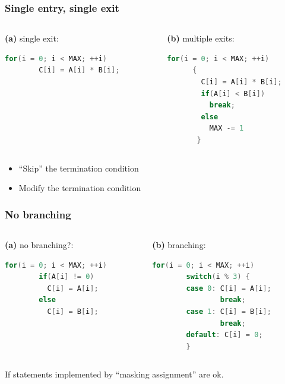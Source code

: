 \documentclass{beamer}
\begin{document}
\begin{frame}[fragile]
  \frametitle{Single entry, single exit}
    \begin{columns}[onlytextwidth]
      \begin{column}{0.5\textwidth}
	 \textbf{(a)} single exit:
	 \begin{lstlisting}[language=C++]
	  for(i = 0; i < MAX; ++i) 
	    C[i] = A[i] * B[i];   
	\end{lstlisting}
      \end{column}
      \begin{column}{0.5\textwidth}
	\textbf{(b)} multiple exits:
	\begin{lstlisting}[language=C++]
	  for(i = 0; i < MAX; ++i) 
	  {
	    C[i] = A[i] * B[i];
	    if(A[i] < B[i])
	      break;
	    else
	      MAX -= 1
	   }
	\end{lstlisting}
      \end{column}
    \end{columns}
    
    \begin{itemize}
     \item ``Skip'' the termination condition
     \item Modify the termination condition
    \end{itemize}

    
\end{frame}

\begin{frame}[fragile]
  \frametitle{No branching}
    \begin{columns}[onlytextwidth]
      \begin{column}{0.5\textwidth}
	 \textbf{(a)} no branching?:
	 \begin{lstlisting}[language=C++]
	  for(i = 0; i < MAX; ++i) 
	    if(A[i] != 0)
	      C[i] = A[i];
	    else
	      C[i] = B[i];
	\end{lstlisting}
      \end{column}
      \begin{column}{0.5\textwidth}
	\textbf{(b)} branching:
	\begin{lstlisting}[language=C++]
	  for(i = 0; i < MAX; ++i) 
	    switch(i % 3) {
	    case 0: C[i] = A[i]; 
	            break;
	    case 1: C[i] = B[i]; 
	            break;
	    default: C[i] = 0;
	    }
	\end{lstlisting}
      \end{column}
    \end{columns}
    
    If statements implemented by ``masking assignment'' are ok.
\end{frame}
\end{document}
